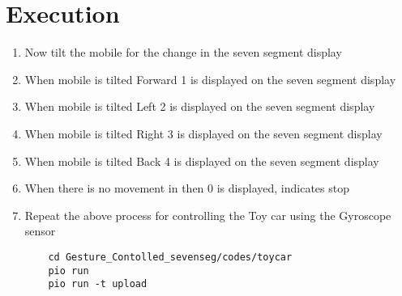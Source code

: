 \section{Execution}
\begin{enumerate}
    \item Now tilt the mobile for the change in the seven segment display
    \item When mobile is tilted Forward 1 is displayed on the seven segment display
    \item When mobile is tilted Left 2 is displayed on the seven segment display
    \item When mobile is tilted Right 3 is displayed on the seven segment display
    \item When mobile is tilted Back 4 is displayed on the seven segment display
    \item When there is no movement in then 0 is displayed, indicates stop
    \item Repeat the above process for controlling the Toy car using the Gyroscope sensor
    \begin{lstlisting}
    cd Gesture_Contolled_sevenseg/codes/toycar
    pio run
    pio run -t upload
    \end{lstlisting}
\end{enumerate}
